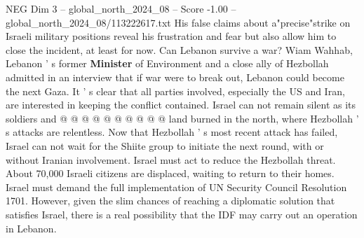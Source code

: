 \begin{textsample}{NEG Dim 3 – global\_north\_2024\_08 – Score -1.00 – global\_north\_2024\_08/113222617.txt}
His false claims about a"precise"strike on Israeli military positions reveal his frustration and fear but also allow him to close the incident, at least for now.
Can Lebanon survive a war?
Wiam Wahhab, Lebanon ' s former \textbf{Minister} of Environment and a close ally of Hezbollah admitted in an interview that if war were to break out, Lebanon could become the next Gaza.
It ' s clear that all parties involved, especially the US and Iran, are interested in keeping the conflict contained.
Israel can not remain silent as its soldiers and @ @ @ @ @ @ @ @ @ @ land burned in the north, where Hezbollah ' s attacks are relentless.
Now that Hezbollah ' s most recent attack has failed, Israel can not wait for the Shiite group to initiate the next round, with or without Iranian involvement.
Israel must act to reduce the Hezbollah threat.
About 70,000 Israeli citizens are displaced, waiting to return to their homes.
Israel must demand the full implementation of UN Security Council Resolution 1701.
However, given the slim chances of reaching a diplomatic solution that satisfies Israel, there is a real possibility that the IDF may carry out an operation in Lebanon.

\end{textsample}
